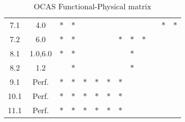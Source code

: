 \begin{table}[htbp]
\begin{tabular}{*{2}{c}|*{11}{c}}
		7.1	&4.0	&$\ast$	&$\ast$	&		&		&		&		&		&		&		&$\ast$	&$\ast$	\\
		7.2	&6.0	&$\ast$	&$\ast$	&		&		&		&$\ast$	&$\ast$	&$\ast$	&		&		&		\\
		8.1	&1.0,6.0&$\ast$	&$\ast$	&		&		&		&		&$\ast$	&		&		&		&		\\
		8.2	&1.2	&		&$\ast$	&		&		&		&		&$\ast$	&		&		&		&		\\
		9.1	&Perf.	&$\ast$	&$\ast$	&$\ast$	&$\ast$	&$\ast$	&$\ast$	&		&		&		&		&		\\
		10.1&Perf.	&$\ast$	&$\ast$	&$\ast$	&$\ast$	&$\ast$	&$\ast$	&		&		&		&		&		\\
		11.1&Perf.	&$\ast$	&$\ast$	&$\ast$	&$\ast$	&$\ast$	&$\ast$	&		&		&		&		&		\\
		\hline
	\end{tabular}
	\caption{OCAS Functional-Physical matrix}
	\label{tab:functPhys}
\end{table}

